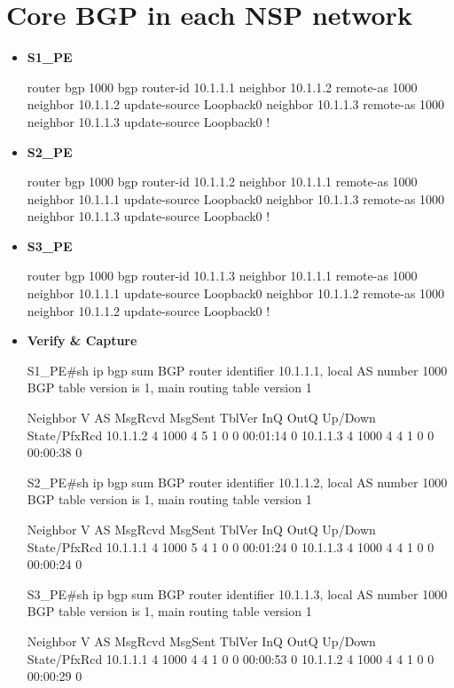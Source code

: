 \documentclass[10pt]{article}
\begin{document}
\section{Core BGP in each NSP network} %
\label{sec:core_bgp_in_each_nsp_network}
\begin{itemize}
	\item {\bf S1\_PE}
	\begin{verbatim*}
		router bgp 1000
		 bgp router-id 10.1.1.1
		 neighbor 10.1.1.2 remote-as 1000
		 neighbor 10.1.1.2 update-source Loopback0
		 neighbor 10.1.1.3 remote-as 1000
		 neighbor 10.1.1.3 update-source Loopback0
		!
	\end{verbatim*}
	\item {\bf S2\_PE}
	\begin{verbatim*}
		router bgp 1000
		 bgp router-id 10.1.1.2
		 neighbor 10.1.1.1 remote-as 1000
		 neighbor 10.1.1.1 update-source Loopback0
		 neighbor 10.1.1.3 remote-as 1000
		 neighbor 10.1.1.3 update-source Loopback0
		!
	\end{verbatim*}
	\item {\bf S3\_PE}
	\begin{verbatim*}
		router bgp 1000
		 bgp router-id 10.1.1.3
		 neighbor 10.1.1.1 remote-as 1000
		 neighbor 10.1.1.1 update-source Loopback0
		 neighbor 10.1.1.2 remote-as 1000
		 neighbor 10.1.1.2 update-source Loopback0
		!
	\end{verbatim*}
	\item {\bf Verify \& Capture}
	\begin{verbatim*}
		S1_PE#sh ip bgp sum
		BGP router identifier 10.1.1.1, local AS number 1000
		BGP table version is 1, main routing table version 1

		Neighbor        V    AS MsgRcvd MsgSent   TblVer  InQ OutQ Up/Down  State/PfxRcd
		10.1.1.2        4  1000       4       5        1    0    0 00:01:14        0
		10.1.1.3        4  1000       4       4        1    0    0 00:00:38        0


		S2_PE#sh ip bgp sum
		BGP router identifier 10.1.1.2, local AS number 1000
		BGP table version is 1, main routing table version 1

		Neighbor        V    AS MsgRcvd MsgSent   TblVer  InQ OutQ Up/Down  State/PfxRcd
		10.1.1.1        4  1000       5       4        1    0    0 00:01:24        0
		10.1.1.3        4  1000       4       4        1    0    0 00:00:24        0

		S3_PE#sh ip bgp sum
		BGP router identifier 10.1.1.3, local AS number 1000
		BGP table version is 1, main routing table version 1

		Neighbor        V    AS MsgRcvd MsgSent   TblVer  InQ OutQ Up/Down  State/PfxRcd
		10.1.1.1        4  1000       4       4        1    0    0 00:00:53        0
		10.1.1.2        4  1000       4       4        1    0    0 00:00:29        0
	\end{verbatim*}
\end{itemize}
\end{document}
